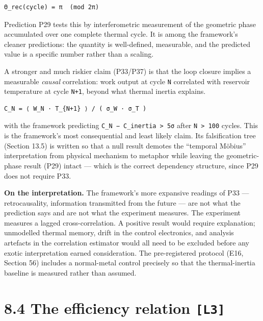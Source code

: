 \documentclass[
  11pt]{report}
\begin{document}
\begin{verbatim}
Θ_rec(cycle) = π  (mod 2π)
\end{verbatim}

Prediction P29 tests this by interferometric measurement of the
geometric phase accumulated over one complete thermal cycle. It is among
the framework's cleaner predictions: the quantity is well-defined,
measurable, and the predicted value is a specific number rather than a
scaling.

A stronger and much riskier claim (P33/P37) is that the loop closure
implies a measurable \emph{causal} correlation: work output at cycle
\texttt{N} correlated with reservoir temperature at cycle \texttt{N+1},
beyond what thermal inertia explains.

\begin{verbatim}
C_N = ⟨ W_N · T_{N+1} ⟩ / ( σ_W · σ_T )
\end{verbatim}

with the framework predicting
\texttt{C\_N\ −\ C\_inertia\ \textgreater{}\ 5σ} after
\texttt{N\ \textgreater{}\ 100} cycles. This is the framework's most
consequential and least likely claim. Its falsification tree (Section
13.5) is written so that a null result demotes the ``temporal Möbius''
interpretation from physical mechanism to metaphor while leaving the
geometric-phase result (P29) intact --- which is the correct dependency
structure, since P29 does not require P33.

\textbf{On the interpretation.} The framework's more expansive readings
of P33 --- retrocausality, information transmitted from the future ---
are not what the prediction says and are not what the experiment
measures. The experiment measures a lagged cross-correlation. A positive
result would require explanation; unmodelled thermal memory, drift in
the control electronics, and analysis artefacts in the correlation
estimator would all need to be excluded before any exotic interpretation
earned consideration. The pre-registered protocol (E16, Section 56)
includes a normal-metal control precisely so that the thermal-inertia
baseline is measured rather than assumed.

\hypertarget{the-efficiency-relation-l3}{%
\section{\texorpdfstring{8.4 The efficiency relation
\texttt{{[}L3{]}}}{8.4 The efficiency relation {[}L3{]}}}\label{the-efficiency-relation-l3}}
\end{document}
